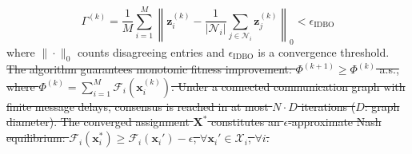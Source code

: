 \documentclass[lettersize,journal]{IEEEtran}
\newcommand{\hladd}[1]{{\color{blue}#1}}
\newcommand{\hldel}[1]{{\color{red}\sout{#1}}}
\begin{document}
\begin{equation}
\label{eq:convergence}
\Gamma^{(k)} = \frac{1}{M} \sum_{i=1}^{M} \left\| \mathbf{z}_i^{(k)} - \frac{1}{|\mathcal{N}_i|} \sum_{j \in \mathcal{N}_i} \mathbf{z}_j^{(k)} \right\|_0 < \epsilon_{\mathrm{IDBO}}
\end{equation}
where $\|\cdot\|_0$ counts disagreeing entries and $\epsilon_{\mathrm{IDBO}}$ is a convergence threshold. 
\hldel{The algorithm guarantees monotonic fitness improvement: $\Phi^{(k+1)} \geq \Phi^{(k)}$ a.s., where $\Phi^{(k)} = \sum_{i=1}^{M} \mathcal{F}_i(\mathbf{x}_i^{(k)})$. Under a connected communication graph with finite message delays, consensus is reached in at most $N \cdot D$ iterations ($D$: graph diameter). The converged assignment $\mathbf{X}^*$ constitutes an $\epsilon$-approximate Nash equilibrium: $\mathcal{F}_i(\mathbf{x}_i^*) \geq \mathcal{F}_i(\mathbf{x}_i') - \epsilon$, $\forall \mathbf{x}_i' \in \mathcal{X}_i$, $\forall i$.} 
\end{document}
